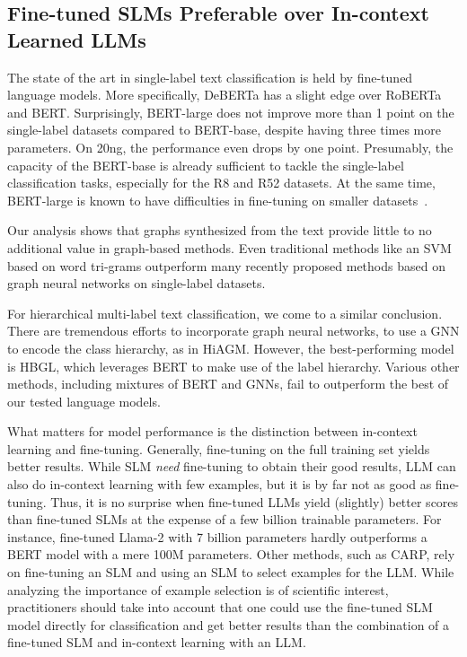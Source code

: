 \documentclass[acmsmall,nonacm]{acmart}
\newcommand{\SLMs}{SLMs\xspace}
\newcommand{\LLMs}{LLMs\xspace}
\begin{document}
\subsection{Fine-tuned \SLMs Preferable over In-context Learned \LLMs}

The state of the art in single-label text classification is held by fine-tuned language models. 
More specifically, DeBERTa has a slight edge over RoBERTa and BERT.
Surprisingly, BERT-large does not improve more than 1 point on the single-label datasets compared to BERT-base, despite having three times more parameters.
On 20ng, the performance even drops by one point.
Presumably, the capacity of the BERT-base is already sufficient to tackle the single-label classification tasks, especially for the R8 and R52 datasets. 
At the same time, BERT-large is known to have difficulties in fine-tuning on smaller datasets~\cite{DBLP:conf/naacl/DevlinCLT19}.

Our analysis shows that graphs synthesized from the text provide little to no additional value in graph-based methods. 
Even traditional methods like an SVM based on word tri-grams outperform many recently proposed methods based on graph neural networks on single-label datasets.

For hierarchical multi-label text classification, we come to a similar conclusion.
There are tremendous efforts to incorporate graph neural networks, \eg to use a GNN to encode the class hierarchy, as in HiAGM. 
However, the best-performing model is HBGL, which leverages BERT to make use of the label hierarchy. 
Various other methods, including mixtures of BERT and GNNs, fail to outperform the best of our tested language models.

What matters for model performance is the distinction between in-context learning and fine-tuning. Generally, fine-tuning on the full training set yields better results. While SLM \emph{need} fine-tuning to obtain their good results, LLM can also do in-context learning with few examples, but it is by far not as good as fine-tuning. Thus, it is no surprise when fine-tuned LLMs yield (slightly) better scores than fine-tuned SLMs at the expense of a few billion trainable parameters. For instance, fine-tuned Llama-2 with 7 billion parameters hardly outperforms a BERT model with a mere 100M parameters. 
Other methods, such as CARP, rely on fine-tuning an SLM and using an SLM to select examples for the LLM. 
While analyzing the importance of example selection is of scientific interest, practitioners should take into account that one could use the fine-tuned SLM model directly for classification and get better results than the combination of a fine-tuned SLM and in-context learning with an LLM.
\end{document}
